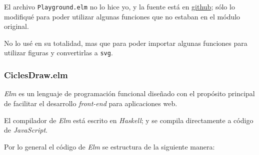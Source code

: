 \documentclass[12pt]{article}
\begin{document}
El archivo \texttt{Playground.elm} no lo hice yo, y la fuente está en \href{https://github.com/evancz/elm-playground/tree/master}{github}; sólo lo modifiqué para poder utilizar algunas funciones que no estaban en el módulo original.

No lo usé en su totalidad, mas que para poder importar algunas funciones para utilizar figuras y convertirlas a \texttt{svg}.

\subsubsection*{CiclesDraw.elm}

\textit{Elm} es un lenguaje de programación funcional diseñado con el propósito principal de facilitar el desarrollo \textit{front-end} para aplicaciones web.

El compilador de \textit{Elm} está escrito en \textit{Haskell}; y se compila directamente a código de \textit{JavaScript}.

Por lo general el código de \textit{Elm} se estructura de la siguiente manera:
\end{document}
